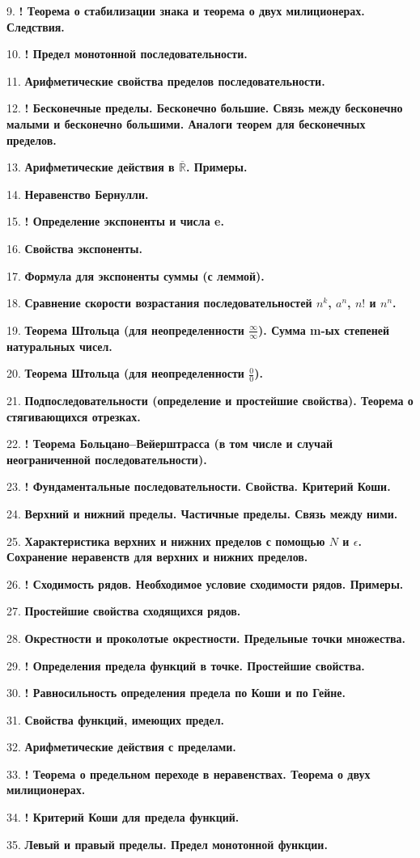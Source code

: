 \documentclass[12pt]{article}
\begin{document}
9. \textbf{! Теорема о стабилизации знака и теорема о двух милиционерах. Следствия.}

10. \textbf{! Предел монотонной последовательности.}

11. \textbf{Арифметические свойства пределов последовательности.}

12. \textbf{! Бесконечные пределы. Бесконечно большие. Связь между бесконечно малыми и бесконечно большими. Аналоги теорем для бесконечных пределов.}

13. \textbf{Арифметические действия в $\overline{\mathbb{R}}$. Примеры.}

14. \textbf{Неравенство Бернулли.}

15. \textbf{! Определение экспоненты и числа e.}

16. \textbf{Свойства экспоненты.}

17. \textbf{Формула для экспоненты суммы (с леммой).}

18. \textbf{Сравнение скорости возрастания последовательностей $n^k$, $a^n$, $n!$ и $n^n$.}

19. \textbf{Теорема Штольца (для неопределенности $\frac{\infty}{\infty}$). Сумма m-ых степеней натуральных чисел.}

20. \textbf{Теорема Штольца (для неопределенности $\frac{0}{0}$).}

21. \textbf{Подпоследовательности (определение и простейшие свойства). Теорема о стягивающихся отрезках. }

22. \textbf{! Теорема Больцано–Вейерштрасса (в том числе и случай неограниченной последовательности).}

23. \textbf{! Фундаментальные последовательности. Свойства. Критерий Коши.}

24. \textbf{Верхний и нижний пределы. Частичные пределы. Связь между ними.}

25. \textbf{Характеристика верхних и нижних пределов с помощью $N$ и $\epsilon$. Сохранение неравенств для верхних и нижних пределов.}

26. \textbf{! Сходимость рядов. Необходимое условие сходимости рядов. Примеры.}

27. \textbf{Простейшие свойства сходящихся рядов.}

28. \textbf{Окрестности и проколотые окрестности. Предельные точки множества.}

29. \textbf{! Определения предела функций в точке. Простейшие свойства.}

30. \textbf{! Равносильность определения предела по Коши и по Гейне.}

31. \textbf{Свойства функций, имеющих предел.}

32. \textbf{Арифметические действия с пределами.}

33. \textbf{! Теорема о предельном переходе в неравенствах. Теорема о двух милиционерах.}

34. \textbf{! Критерий Коши для предела функций.}

35. \textbf{Левый и правый пределы. Предел монотонной функции.}
\end{document}
